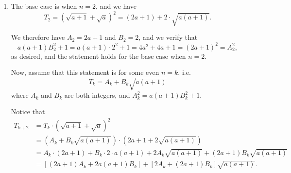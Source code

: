 \Question{\currfilebase}

\begin{enumerate}
    \item The base case is when \(n = 2\), and we have
          \[
              T_2 = (\sqrt{a + 1} + \sqrt{a})^2 = (2a + 1) + 2 \cdot \sqrt{a (a + 1)}.
          \]

          We therefore have \(A_2 = 2a + 1\) and \(B_2 = 2\), and we verify that
          \[
              a(a + 1) B_2^2 + 1 = a (a + 1) \cdot 2^2 + 1 = 4a^2 + 4a + 1 = (2a + 1)^2 = A_2^2,
          \]
          as desired, and the statement holds for the base case when \(n = 2\).

          Now, assume that this statement is for some even \(n = k\), i.e.
          \[
              T_k = A_k + B_k \sqrt{a (a + 1)}
          \]
          where \(A_k\) and \(B_k\) are both integers, and \(A_k^2 = a(a + 1) B_k^2 + 1\).

          Notice that
          \begin{align*}
              T_{k + 2} & = T_k \cdot \left(\sqrt{a + 1} + \sqrt{a}\right)^2                                                       \\
                        & = \left(A_k + B_k \sqrt{a(a + 1)}\right) \cdot \left(2a + 1 + 2 \sqrt{a(a + 1)}\right)                   \\
                        & = A_k \cdot (2a + 1) + B_k \cdot 2 \cdot a (a + 1) + 2A_k \sqrt{a(a + 1)} + (2a + 1) B_k \sqrt{a(a + 1)} \\
                        & = \left[(2a + 1)A_k + 2a(a + 1)B_k\right] + \left[2 A_k + (2a + 1)B_k\right] \sqrt{a(a + 1)}.
          \end{align*}


\end{enumerate}
